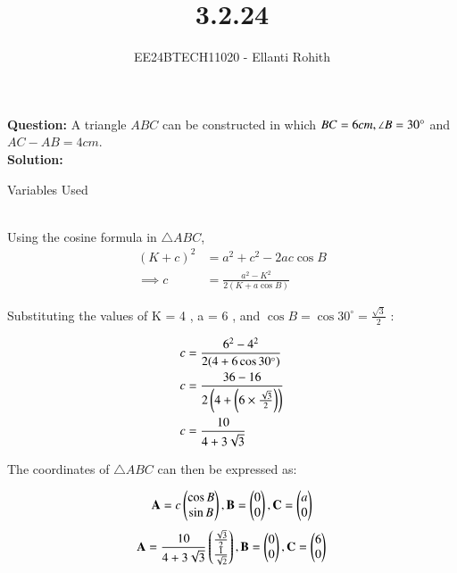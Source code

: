 \documentclass[journal]{IEEEtran}
\begin{document}

\vspace{3cm}

\title{3.2.24}
\author{EE24BTECH11020 - Ellanti Rohith
}
{\let\newpage\relax\maketitle}

\renewcommand{\thefigure}{\theenumi}
\renewcommand{\thetable}{\theenumi}
\setlength{\intextsep}{10pt} %

\textbf{Question:}  A triangle $ABC$ can be constructed in which $BC = 6cm, \angle B =30\degree$ and $AC - AB=4cm$.\\

\textbf{Solution:}
\begin{table}[h!]    
  \centering
  
  \caption{Variables Used}
  
\end{table}\\
Using the cosine formula in  $\triangle ABC$,
\begin{align}
    (K + c)^2 &= a^2 + c^2 - 2ac \cos B \\
    \implies c &= \frac{a^2 - K^2}{2(K + a \cos B)}
\end{align}

Substituting the values of  K = 4 ,  a = 6 , and $\cos B = \cos 30^\circ = \frac{\sqrt{3}}{2}$ :

\begin{align}
    c &= \frac{6^2 - 4^2}{2(4 + 6 \cos 30^\circ)} \\
    c &= \frac{36 - 16}{2\left(4 + \left(6 \times \frac{\sqrt{3}}{2}\right)\right)} \\
    c &= \frac{10}{4 + 3\sqrt{3}}
\end{align}

The coordinates of \( \triangle ABC \) can then be expressed as:

\begin{align}
    \mathbf{A} = c \begin{pmatrix}\cos{B} \\ \sin{B}\end{pmatrix}, 
    \mathbf{B} = \begin{pmatrix}0 \\ 0\end{pmatrix}, 
    \mathbf{C} = \begin{pmatrix}a \\ 0\end{pmatrix}   
\end{align}
\begin{align}
    \mathbf{A} =  \frac{10}{4 + 3\sqrt{3}}\begin{pmatrix}\frac{\sqrt{3}}{2} \\ \frac{1}{\sqrt{2}}\end{pmatrix}, 
    \mathbf{B} = \begin{pmatrix}0 \\ 0\end{pmatrix}, 
    \mathbf{C} = \begin{pmatrix}6 \\ 0\end{pmatrix}   
\end{align}
\end{document}
